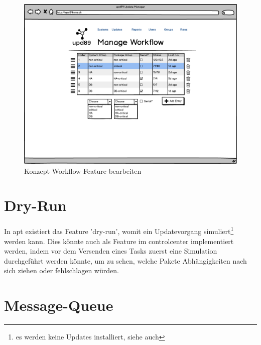 \begin{figure}[H]
	\centering
	\includegraphics[width=\linewidth]{files/mockups/workflow_CRUD}
	\caption{Konzept Workflow-Feature bearbeiten}
	\label{fig:ausblick:workflow_crud}
\end{figure}


\section{Dry-Run}

In \gls{apt} existiert das Feature 'dry-run', womit ein Updatevorgang simuliert\footnote{es werden keine Updates installiert, siehe auch } werden kann. Dies könnte auch als Feature im \gls{controlcenter} implementiert werden, indem vor dem Versenden eines Tasks zuerst eine Simulation durchgeführt werden könnte, um zu sehen, welche Pakete Abhängigkeiten nach sich ziehen oder fehlschlagen würden.

\section{Message-Queue}
\label{sec:ausblick:message_queue}



